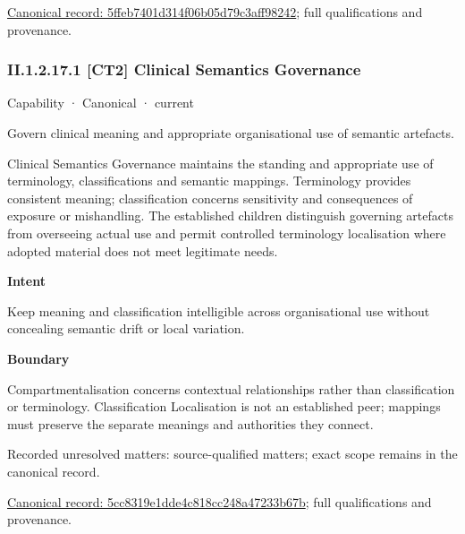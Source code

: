 {\footnotesize \href{../../../../continuum/strategy/capability/5ffeb7401d314f06b05d79c3aff98242.md}{Canonical record: 5ffeb7401d314f06b05d79c3aff98242}; full qualifications and provenance.}\par
\subsubsection*{II.1.2.17.1 [CT2] Clinical Semantics Governance}
\label{navigation:II.1.2.17.1}

\label{element:5cc8319e1dde4c818cc248a47233b67b}
{\small Capability · Canonical · current}\par

Govern clinical meaning and appropriate organisational use of semantic artefacts.



Clinical Semantics Governance maintains the standing and appropriate use of terminology, classifications and semantic mappings. Terminology provides consistent meaning; classification concerns sensitivity and consequences of exposure or mishandling. The established children distinguish governing artefacts from overseeing actual use and permit controlled terminology localisation where adopted material does not meet legitimate needs.



\textbf{Intent}



Keep meaning and classification intelligible across organisational use without concealing semantic drift or local variation.



\textbf{Boundary}



Compartmentalisation concerns contextual relationships rather than classification or terminology. Classification Localisation is not an established peer; mappings must preserve the separate meanings and authorities they connect.


{\small Recorded unresolved matters: source-qualified matters; exact scope remains in the canonical record.}\par
{\footnotesize \href{../../../../continuum/strategy/capability/5cc8319e1dde4c818cc248a47233b67b.md}{Canonical record: 5cc8319e1dde4c818cc248a47233b67b}; full qualifications and provenance.}\par
